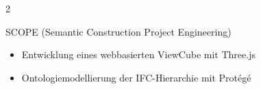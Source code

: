 \documentclass[10pt,a4paper,withhyper]{../altacv}
\begin{document}
\begin{paracol}{2}
  \vspace{0.5em}


  SCOPE (Semantic Construction Project Engineering)
  \begin{itemize}
    \item Entwicklung eines webbasierten ViewCube mit Three.js
    \item Ontologiemodellierung der IFC-Hierarchie mit Protégé
  \end{itemize}

  \divider



  \medskip


\end{paracol}
\end{document}
